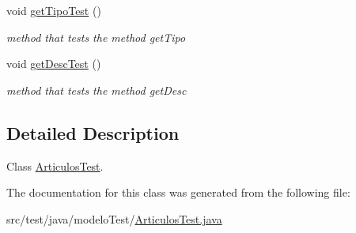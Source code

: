 \begin{DoxyCompactItemize}
void \mbox{\hyperlink{classmodelo_test_1_1_articulos_test_ad0c98f454266688a9c8cfe1659c9a649}{get\+Tipo\+Test}} ()
\begin{DoxyCompactList}\small\item\em method that tests the method get\+Tipo \end{DoxyCompactList}\item 
\mbox{\label{classmodelo_test_1_1_articulos_test_a659341a9a39434a6dcca5c64e2ab650d}} 
void \mbox{\hyperlink{classmodelo_test_1_1_articulos_test_a659341a9a39434a6dcca5c64e2ab650d}{get\+Desc\+Test}} ()
\begin{DoxyCompactList}\small\item\em method that tests the method get\+Desc \end{DoxyCompactList}\end{DoxyCompactItemize}


\subsection{Detailed Description}
Class \mbox{\hyperlink{classmodelo_test_1_1_articulos_test}{Articulos\+Test}}. 

The documentation for this class was generated from the following file\+:\begin{DoxyCompactItemize}
\item 
src/test/java/modelo\+Test/\mbox{\hyperlink{_articulos_test_8java}{Articulos\+Test.\+java}}\end{DoxyCompactItemize}
